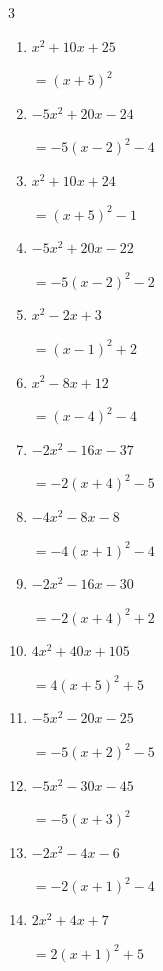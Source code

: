 \begin{multicols}{3}
\begin{enumerate}
  \item $x^{2}+10x+25$

        $=\left( x+5\right)^{2}$

  \item $-5x^{2}+20x-24$

        $=-5\left( x-2\right)^{2}-4$

  \item $x^{2}+10x+24$

        $=\left( x+5\right)^{2}-1$

  \item $-5x^{2}+20x-22$

        $=-5\left( x-2\right)^{2}-2$

  \item $x^{2}-2x+3$

        $=\left( x-1\right)^{2}+2$

  \item $x^{2}-8x+12$

        $=\left( x-4\right)^{2}-4$

\columnbreak %

  \item $-2x^{2}-16x-37$

        $=-2\left( x+4\right)^{2}-5$

  \item $-4x^{2}-8x-8$

        $=-4\left( x+1\right)^{2}-4$

  \item $-2x^{2}-16x-30$

        $=-2\left( x+4\right)^{2}+2$

  \item $4x^{2}+40x+105$

        $=4\left( x+5\right)^{2}+5$

  \item $-5x^{2}-20x-25$

        $=-5\left( x+2\right)^{2}-5$

  \item $-5x^{2}-30x-45$

        $=-5\left( x+3\right)^{2}$

  \item $-2x^{2}-4x-6$

        $=-2\left( x+1\right)^{2}-4$

  \item $2x^{2}+4x+7$

        $=2\left( x+1\right)^{2}+5$


\end{enumerate}
\end{multicols}
